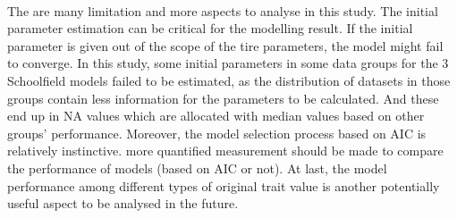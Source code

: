 \documentclass[12pt,a4paper]{article}
\begin{document}
\\
The are many limitation and more aspects to analyse in this study. The initial parameter estimation can be critical for the modelling result. If the initial parameter is given out of the scope of the tire parameters, the model might fail to converge. In this study, some initial parameters in some data groups for the 3 Schoolfield models failed to be estimated, as the distribution of datasets in those groups contain less information for the parameters to be calculated. And these end up in NA values which are allocated with median values based on other groups’ performance.
Moreover, the model selection process based on AIC is relatively instinctive. more quantified measurement should be made to compare the performance of models (based on AIC or not).
At last, the model performance among different types of original trait value is another potentially useful aspect to be analysed in the future.

\newpage




\end{document}
